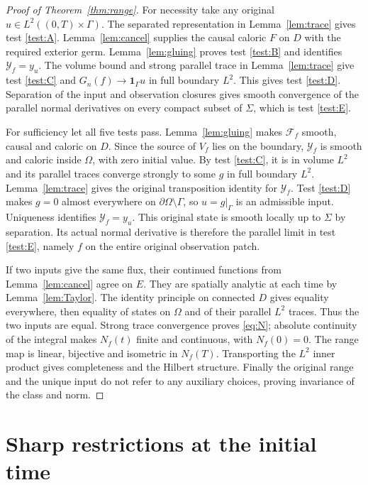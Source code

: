 \documentclass[11pt]{article}
\theoremstyle{remark}
\newcommand{\Om}{\Omega}
\newcommand{\calF}{\mathcal F}
\newcommand{\calY}{\mathcal Y}
\begin{document}
\begin{proof}[Proof of Theorem~\ref{thm:range}]
For necessity take any original $u\in L^2((0,T)\times\Gamma)$.
The separated representation in Lemma~\ref{lem:trace} gives test
\ref{test:A}.
Lemma~\ref{lem:cancel} supplies the causal caloric $F$ on $D$ with the
required exterior germ.
Lemma~\ref{lem:gluing} proves test \ref{test:B} and identifies
$\calY_f=y_u$.
The volume bound and strong parallel trace in Lemma~\ref{lem:trace}
give test \ref{test:C} and
$G_n(f)\to\mathbf1_\Gamma u$ in full boundary $L^2$.
This gives test \ref{test:D}.
Separation of the input and observation closures gives smooth convergence
of the parallel normal derivatives on every compact subset of $\Sigma$,
which is test \ref{test:E}.

For sufficiency let all five tests pass.
Lemma~\ref{lem:gluing} makes $\calF_f$ smooth, causal and caloric on $D$.
Since the source of $V_f$ lies on the boundary, $\calY_f$ is smooth and
caloric inside $\Om$, with zero initial value.
By test \ref{test:C}, it is in volume $L^2$ and its parallel traces
converge strongly to some $g$ in full boundary $L^2$.
Lemma~\ref{lem:trace} gives the original transposition identity for $\calY_f$.
Test \ref{test:D} makes $g=0$ almost everywhere on
$\partial\Om\setminus\Gamma$, so $u=g|_\Gamma$ is an admissible input.
Uniqueness identifies $\calY_f=y_u$.
This original state is smooth locally up to $\Sigma$ by separation.
Its actual normal derivative is therefore the parallel limit in test
\ref{test:E}, namely $f$ on the entire original observation patch.

If two inputs give the same flux, their continued functions from
Lemma~\ref{lem:cancel} agree on $E$.
They are spatially analytic at each time by Lemma~\ref{lem:Taylor}.
The identity principle on connected $D$ gives equality everywhere,
then equality of states on $\Om$ and of their parallel $L^2$ traces.
Thus the two inputs are equal.
Strong trace convergence proves \eqref{eq:N}; absolute continuity of the
integral makes $N_f(t)$ finite and continuous, with $N_f(0)=0$.
The range map is linear, bijective and isometric in $N_f(T)$.
Transporting the $L^2$ inner product gives completeness and the Hilbert
structure.
Finally the original range and the unique input do not refer to any
auxiliary choices, proving invariance of the class and norm.
\end{proof}

\section{Sharp restrictions at the initial time}\label{sec:sharp}
\end{document}
